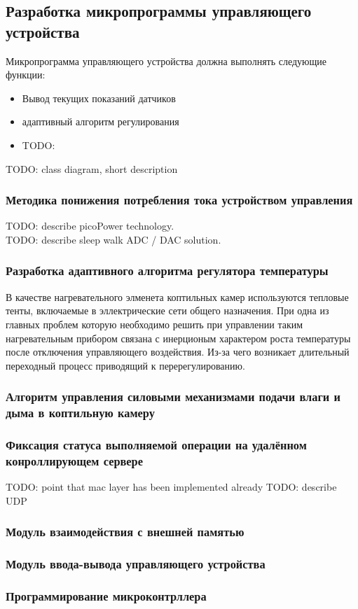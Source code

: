 \subsection{Разработка микропрограммы управляющего устройства}
Микропрограмма управляющего устройства должна выполнять следующие функции:
\begin{itemize}
    \item{} Вывод текущих показаний датчиков
    \item{} адаптивный алгоритм регулирования
    \item{} TODO:
\end{itemize}

TODO: class diagram, short description

\subsubsection{Методика понижения потребления тока устройством управления}
TODO: describe picoPower technology. \\
TODO: describe sleep walk ADC / DAC solution.

\subsubsection{Разработка адаптивного алгоритма регулятора температуры}
В качестве нагревательного элменета коптильных камер используются тепловые тенты,
включаемые в эллектрические сети общего назначения. При одна из главных проблем
которую необходимо решить при управлении таким нагревательным прибором связана
с инерционым характером роста температуры после отключения управляющего воздействия.
Из-за чего возникает длительный переходный процесс приводящий к перерегулированию.

\subsubsection{Алгоритм управления силовыми механизмами подачи влаги и дыма в коптильную камеру}

\subsubsection{Фиксация статуса выполняемой операции на удалённом конроллирующем сервере}
TODO: point that mac layer has been implemented already
TODO: describe UDP \\

\subsubsection{Модуль взаимодействия с внешней памятью}

\subsubsection{Модуль ввода-вывода управляющего устройства}

\subsubsection{Программирование микроконтрллера}

